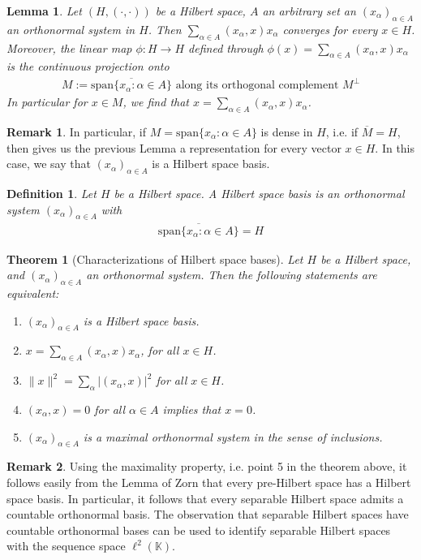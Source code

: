 \documentclass[11pt,a4paper]{article}
\newtheorem{lem}{Lemma}[section]
\newtheorem{thm}{Theorem}[section]
\newtheorem{defn}{Definition}[section]
\theoremstyle{definition}
\newtheorem{rem}{Remark}[section]
\begin{document}
\begin{lem} Let $(H, ( \cdot , \cdot))$ be a Hilbert space, $A$ an arbitrary set an $(x_\alpha)_{\alpha \in A}$ an orthonormal system in $H$. Then $\sum_{ \alpha \in A} ( x_\alpha ,x) x_\alpha$ converges for every $x \in H$. Moreover, the linear map $\phi : H \to H$ defined through $\phi(x) = \sum_{ \alpha \in A} (x_\alpha, x) x_\alpha$ is the continuous projection onto
\begin{align*}
M:= \overline{\text{span}\lbrace x_\alpha : \alpha \in A \rbrace } \text{ along its orthogonal complement } M^\perp
\end{align*}
In particular for $x \in M$, we find that $x = \sum_{ \alpha \in A} (x_\alpha, x) x_\alpha$. 
\end{lem}
\newpage
\begin{rem} In particular, if $M = \text{span} \lbrace x_\alpha :  \alpha \in A \rbrace$ is dense in $H$, i.e. if $\overline{M}=H$, then gives us the previous Lemma a representation for every vector $x \in H$. In this case, we say that $(x_\alpha)_{ \alpha \in A}$ is a Hilbert space basis. 
\end{rem}
\begin{defn} Let $H$ be a Hilbert space. A Hilbert space basis is an orthonormal system $(x_\alpha)_{ \alpha \in A}$ with \begin{align*}
\overline{\text{span} \lbrace x_\alpha : \alpha \in A \rbrace }=H
\end{align*}
\end{defn}
\begin{thm}[Characterizations of Hilbert space bases] Let $H$ be a Hilbert space, and $(x_\alpha)_{ \alpha \in A}$ an orthonormal system. Then the following statements are equivalent:
\begin{enumerate}
\item $(x_\alpha)_{ \alpha \in A}$ is a Hilbert space basis.
\item $x= \sum_{ \alpha \in A} (x_\alpha, x) x_\alpha$, for all $x \in H$.
\item $\|x\|^2 = \sum_{ \alpha} |(x_\alpha, x)|^2$ for all $x \in H$. 
\item $(x_\alpha, x)=0$ for all $\alpha \in A$ implies that $x=0$.
\item $(x_\alpha)_{\alpha \in A}$ is a maximal orthonormal system in the sense of inclusions. 
\end{enumerate}
\end{thm}
\begin{rem} Using the maximality property, i.e. point 5 in the theorem above, it follows easily from the Lemma of Zorn that every pre-Hilbert space has a Hilbert space basis. In particular, it follows that every separable Hilbert space admits a countable orthonormal basis. The observation that separable Hilbert spaces have countable orthonormal bases can be used to identify separable Hilbert spaces with the sequence space $\ell^2( \mathbb{K})$. 
\end{rem}
\end{document}
